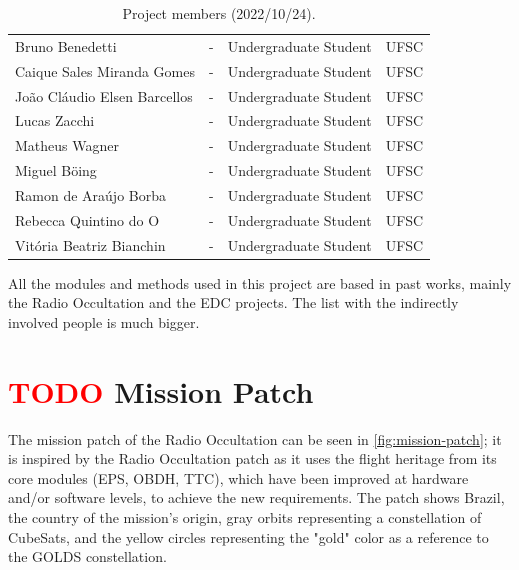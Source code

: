 \begin{table}[!htb]
\begin{tabular}{lllc}
        Bruno Benedetti                     & -         & Undergraduate Student & UFSC \\
        Caique Sales Miranda Gomes          & -         & Undergraduate Student & UFSC \\
        João Cláudio Elsen Barcellos        & -         & Undergraduate Student & UFSC \\
        Lucas Zacchi                        & -         & Undergraduate Student & UFSC \\
        Matheus Wagner                      & -         & Undergraduate Student & UFSC \\
        Miguel Böing                        & -         & Undergraduate Student & UFSC \\
        Ramon de Araújo Borba               & -         & Undergraduate Student & UFSC \\
        Rebecca Quintino do O               & -         & Undergraduate Student & UFSC \\
        Vitória Beatriz Bianchin            & -         & Undergraduate Student & UFSC \\
        \bottomrule[1.5pt]
    \end{tabular}
    \caption{Project members (2022/10/24).}
    \label{tab:team-members}
\end{table}

All the modules and methods used in this project are based in past works, mainly the Radio Occultation and the EDC projects. The list with the indirectly involved people is much bigger.

\section{ \textcolor{red}{TODO} Mission Patch}

The mission patch of the Radio Occultation can be seen in \autoref{fig:mission-patch}; it is inspired by the Radio Occultation patch \cite{floripasat} as it uses the flight heritage from its core modules (EPS, OBDH, TTC), which have been improved at hardware and/or software levels, to achieve the new requirements. The patch shows Brazil, the country of the mission's origin, gray orbits representing a constellation of CubeSats, and the yellow circles representing the "gold" color as a reference to the GOLDS constellation.

